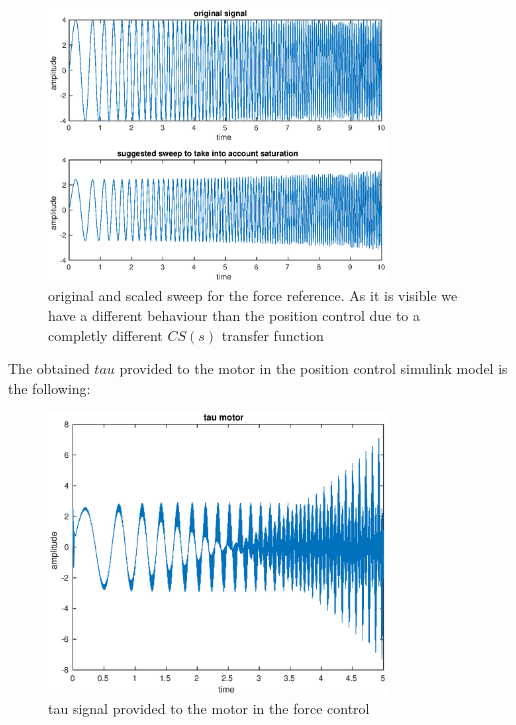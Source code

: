 \documentclass[a4paper,11pt]{article}
\begin{document}
\begin{figure}[H]
\begin{center}
\includegraphics[width=0.8\textwidth]{images/force_scaled.eps}
\end{center}
\caption{original and scaled sweep for the force reference. As it is visible we have a different behaviour than the position control due to a completly different $CS(s)$ transfer function}
\label{fig:force_ref}
\end{figure}

\noindent The obtained $tau$ provided to the motor in the position control simulink model is the following:

\begin{figure}[H]
\begin{center}
\includegraphics[width=0.8\textwidth]{images/force_tau.eps}
\end{center}
\caption{tau signal provided to the motor in the force control}
\label{fig:force_tau}
\end{figure}
\end{document}

